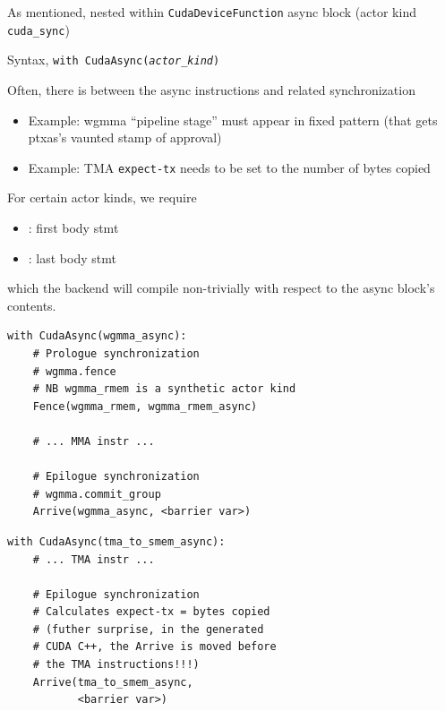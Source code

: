 \begin{minipage}[t]{0.48\textwidth}\fixminipage
As mentioned, nested within \texttt{CudaDeviceFunction} async block (actor kind \texttt{cuda\_sync})

Syntax, \texttt{with CudaAsync(\textit{actor\_kind})}

Often, there is  between the async instructions and related synchronization
\begin{itemize}
\item Example: wgmma ``pipeline stage'' must appear in fixed pattern (that gets ptxas's vaunted stamp of approval)
\item Example: TMA \texttt{expect-tx} needs to be set to the number of bytes copied
\end{itemize}
\vspace{12mm}
For certain actor kinds, we  require
\begin{itemize}
\item {}: first body stmt
\item {}: last body stmt
\end{itemize}
which the backend will compile non-trivially with respect to the async block's contents.

\end{minipage}
\hfill
\begin{minipage}[t]{0.48\textwidth}\fixminipage
{}
\begin{verbatim}
with CudaAsync(wgmma_async):
    # Prologue synchronization
    # wgmma.fence
    # NB wgmma_rmem is a synthetic actor kind
    Fence(wgmma_rmem, wgmma_rmem_async)

    # ... MMA instr ...

    # Epilogue synchronization
    # wgmma.commit_group
    Arrive(wgmma_async, <barrier var>)
\end{verbatim}
\begin{verbatim}
with CudaAsync(tma_to_smem_async):
    # ... TMA instr ...

    # Epilogue synchronization
    # Calculates expect-tx = bytes copied
    # (futher surprise, in the generated
    # CUDA C++, the Arrive is moved before
    # the TMA instructions!!!)
    Arrive(tma_to_smem_async,
           <barrier var>)
\end{verbatim}
\end{minipage}

